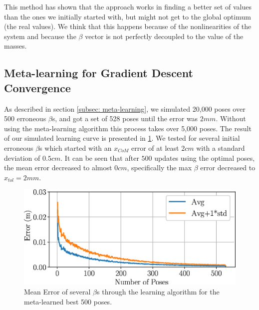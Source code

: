 \documentclass[letterpaper, 10 pt, conference]{ieeeconf}  %
\newcommand{\Bogdan}[1]{\textcolor{red}{\textbf{Bogdan:} #1}}
\begin{document}
This method has shown that the approach works in finding a better set of values than the ones we initially started with, but might not get to the global optimum (the real values). We think that this happens because of the nonlinearities of the system and because the $\beta$ vector is not perfectly decoupled to the value of the masses.

\subsection{Meta-learning for Gradient Descent Convergence}
\label{subsec:Meta-learning}
As described in section \ref{subsec: meta-learning}, we simulated 20,000 poses over 500 erroneous $\beta$s, and got a set of 528 poses until the error was $2mm$. Without using the meta-learning algorithm this process takes  over 5,000 poses. The result of our simulated learning curve is presented in \cref{fig:Error_sim}. We tested for several initial erroneous $\beta$s which started with an $x_{CoM}$ error of at least $2 cm$ with a standard deviation of $0.5 cm$. It can be seen that after $500$ updates using the optimal poses, the mean error decreased to almost $0 cm$, specifically the max $\beta$ error decreased to $x_{tol} = 2mm$.
\begin{figure} [htb]
\centering
\includegraphics[width=0.8\columnwidth]{figs/Simulation_results.eps}
\vspace{-0.8\baselineskip}
\caption{\label{fig:Error_sim} Mean Error of several $\beta$s through the learning algorithm for the meta-learned best 500 poses.}
\end{figure}
\end{document}
